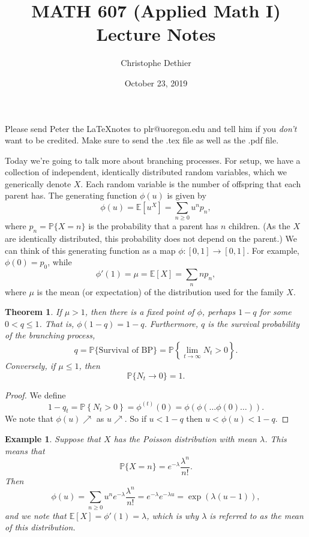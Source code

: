 \documentclass[12pt]{article}
\title{MATH 607 (Applied Math I) Lecture Notes}
\author{Christophe Dethier}
\date{October 23, 2019}
\theoremstyle{plain}
\newtheorem*{theorem*}{Theorem}
\newtheorem*{example*}{Example}
\begin{document}
\bigskip
\maketitle

Please send Peter the \LaTeX notes to plr@uoregon.edu and tell him if you \emph{don't} want to be credited. Make sure to send the .tex file as well as the .pdf file.

Today we're going to talk more about branching processes. For setup, we have a collection of independent, identically distributed random variables, which we generically denote $X$. Each random variable is the number of offspring that each parent has. The generating function $\phi(u)$ is given by
\[
\phi(u) = \mathbb{E}[u^X] = \sum_{n \geq 0} u^n p_n,
\]
where $p_n = \mathbb{P}\{X = n\}$ is the probability that a parent has $n$ children. (As the $X$ are identically distributed, this probability does not depend on the parent.) We can think of this generating function as a map $\phi: [0,1] \rightarrow [0,1]$. For example, $\phi(0) = p_0$, while
\[
\phi'(1) = \mu = \mathbb{E}[X] = \sum_n n p_n,
\]
where $\mu$ is the mean (or expectation) of the distribution used for the family $X$.

\begin{theorem*}
If $\mu > 1$, then there is a fixed point of $\phi$, perhaps $1-q$ for some $0 < q \leq 1$. That is, $\phi(1-q) = 1-q$. Furthermore, $q$ is the survival probability of the branching process,
\[
q = \mathbb{P}\{\text{Survival of BP}\} = \mathbb{P}\left\{\lim_{t \rightarrow \infty} N_t > 0\right\}.
\]
Conversely, if $\mu \leq 1$, then
\[
\mathbb{P}\{N_t \rightarrow 0\} = 1.
\]
\end{theorem*}

\begin{proof}
We define
\[
1 - q_t = \mathbb{P} \left\{N_t > 0\right\} = \phi^{(t)}(0) = \phi(\phi(\ldots \phi(0)\ldots )).
\]
We note that $\phi(u) \nearrow$ as $u \nearrow$. So if $u < 1-q$ then $u < \phi(u) < 1-q$.
\end{proof}

\begin{example*}
Suppose that $X$ has the Poisson distribution with mean $\lambda$. This means that
\[
\mathbb{P}\{X = n\} = e^{-\lambda} \frac{\lambda^n}{n!}.
\]
Then
\[
\phi(u) = \sum_{n \geq 0} u^n e^{-\lambda} \frac{\lambda^n}{n!} = e^{-\lambda} e^{-\lambda u} = \exp(\lambda(u-1)),
\]
and we note that $\mathbb{E}[X] = \phi'(1) = \lambda$, which is why $\lambda$ is referred to as the mean of this distribution.
\end{example*}
\end{document}
